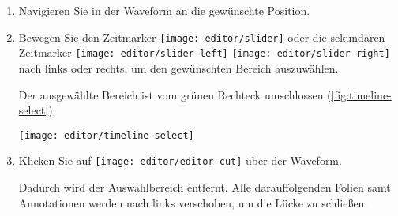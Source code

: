 \newcommand{\editorslider}{%
  \begingroup\normalfont
  \texttt{[image: editor/slider]}%
  \endgroup
}
\newcommand{\editorsecondarysliderleft}{%
  \begingroup\normalfont
  \texttt{[image: editor/slider-left]}%
  \endgroup
}
\newcommand{\editorsecondarysliderright}{%
  \begingroup\normalfont
  \texttt{[image: editor/slider-right]}%
  \endgroup
}
\newcommand{\editorundo}{%
  \begingroup\normalfont
  \texttt{[image: editor/editor-undo]}%
  \endgroup
}
\newcommand{\editorcut}{%
  \begingroup\normalfont
  \texttt{[image: editor/editor-cut]}%
  \endgroup
}
\newcommand{\editoradjustvolume}{%
  \begingroup\normalfont
  \texttt{[image: editor/adjust-volume]}%
  \endgroup
}
\newcommand{\editorcollapseselection}{%
  \begingroup\normalfont
  \texttt{[image: editor/collapse-selection]}%
  \endgroup
}
\newcommand{\editorcutpage}{%
  \begingroup\normalfont
  \texttt{[image: editor/editor-cut-page]}%
  \endgroup
}
\newcommand{\editorreplacepage}{%
  \begingroup\normalfont
  \texttt{[image: editor/replace-page]}%
  \endgroup
}
\newcommand{\editorplay}{%
  \begingroup\normalfont
  \texttt{[image: editor/editor-play]}%
  \endgroup
}

\begin{enumerate}
	\item Navigieren Sie in der Waveform an die gewünschte Position.
	\item Bewegen Sie den Zeitmarker \editorslider{} oder die sekundären Zeitmarker \editorsecondarysliderleft{}\editorsecondarysliderright{} nach links oder rechts, um den gewünschten Bereich auszuwählen.

	Der ausgewählte Bereich ist vom grünen Rechteck umschlossen (\autoref{fig:timeline-select}).

	\begin{minipage}{0.9\textwidth}
		\centering
		\captionsetup{type=figure}
		\texttt{[image: editor/timeline-select]}
		\label{fig:timeline-select}
	\end{minipage}

	\item Klicken Sie auf  \editorcut{} über der Waveform.
	
	Dadurch wird der Auswahlbereich entfernt. Alle darauffolgenden Folien samt Annotationen werden nach links verschoben, um die Lücke zu schließen.
\end{enumerate}

